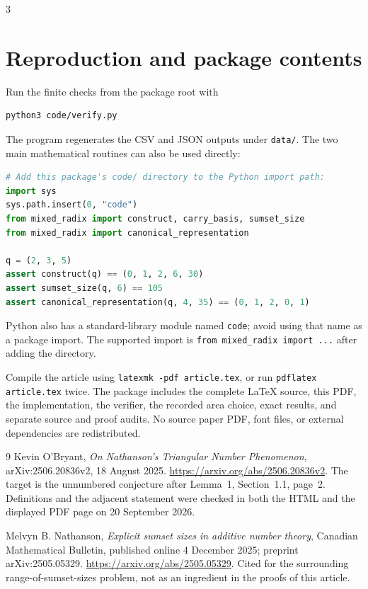 \documentclass[11pt]{article}
\numberwithin{equation}{section}
\theoremstyle{definition}
\theoremstyle{remark}\newtheorem{remark}[theorem]{Remark}
\begin{document}
\begin{multicols}{3}
\footnotesize
{}
\begin{enumerate}[leftmargin=2.3em,label=\arabic*.,itemsep=0.12em,parsep=0pt]

\end{enumerate}
\end{multicols}

\clearpage
\section{Reproduction and package contents}

Run the finite checks from the package root with
\begin{lstlisting}
python3 code/verify.py
\end{lstlisting}
The program regenerates the CSV and JSON outputs under \texttt{data/}.
The two main mathematical routines can also be used directly:
\begin{lstlisting}[language=Python]
# Add this package's code/ directory to the Python import path:
import sys
sys.path.insert(0, "code")
from mixed_radix import construct, carry_basis, sumset_size
from mixed_radix import canonical_representation

q = (2, 3, 5)
assert construct(q) == (0, 1, 2, 6, 30)
assert sumset_size(q, 6) == 105
assert canonical_representation(q, 4, 35) == (0, 1, 2, 0, 1)
\end{lstlisting}
Python also has a standard-library module named \texttt{code}; avoid using
that name as a package import.  The supported import is
\texttt{from mixed\_radix import ...} after adding the directory.

Compile the article using \texttt{latexmk -pdf article.tex}, or run
\texttt{pdflatex article.tex} twice.  The package includes the complete
\LaTeX{} source, this PDF, the implementation, the verifier, the recorded
area choice, exact results, and separate source and proof audits.  No source
paper PDF, font files, or external dependencies are redistributed.

\begin{thebibliography}{9}
Kevin O'Bryant,
\emph{On Nathanson's Triangular Number Phenomenon},
arXiv:2506.20836v2, 18 August 2025.
\url{https://arxiv.org/abs/2506.20836v2}.
The target is the unnumbered conjecture after Lemma~1,
Section~1.1, page~2.  Definitions and the adjacent statement were checked
in both the HTML and the displayed PDF page on 20 September 2026.

Melvyn B. Nathanson,
\emph{Explicit sumset sizes in additive number theory},
Canadian Mathematical Bulletin, published online 4 December 2025;
preprint arXiv:2505.05329.
\url{https://arxiv.org/abs/2505.05329}.
Cited for the surrounding range-of-sumset-sizes problem, not as an ingredient
in the proofs of this article.
\end{thebibliography}
\end{document}
